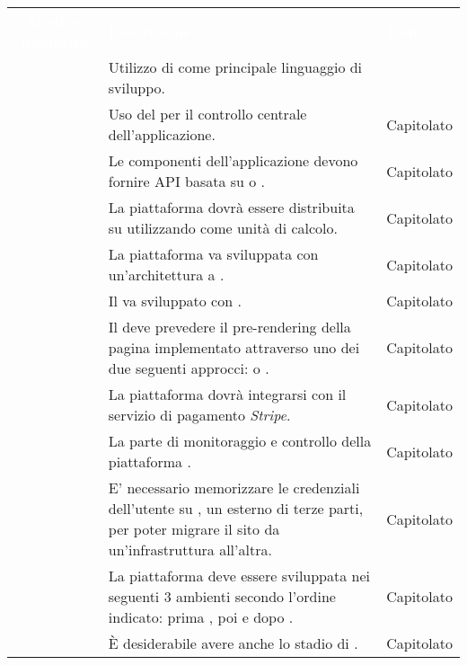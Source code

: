 \renewcommand{\arraystretch}{1.5}
\begin{longtable}{|c C{9.5cm} C{2.5cm}|} 
	
	\textcolor{white}{\textbf{Codice Requisito}}&
	\textcolor{white}{\textbf{Descrizione}}&
	\textcolor{white}{\textbf{Fonte}}\\
	
	 & Utilizzo di  come principale linguaggio di sviluppo. &  \\
	
	 & Uso del   per il controllo centrale dell'applicazione. & Capitolato \\
	
	 & Le componenti dell'applicazione devono fornire API basata su  o . & Capitolato \\
	
	 & La piattaforma dovrà essere distribuita su  utilizzando  come unità di calcolo. & Capitolato \\
	
	 & La piattaforma va sviluppata con un'architettura a . & Capitolato \\
	
	 & Il  va sviluppato con . & Capitolato \\
	
	 & Il  deve prevedere il pre-rendering della pagina  implementato attraverso uno dei due seguenti approcci:  o . & Capitolato \\
	
	 & La piattaforma dovrà integrarsi con il servizio di pagamento \textit{Stripe}. & Capitolato \\
	
	 & La parte di monitoraggio e controllo della piattaforma . & Capitolato \\
	
	 & E' necessario memorizzare le credenziali dell'utente su , un  esterno di terze parti, per poter migrare il sito da un'infrastruttura all'altra. & Capitolato \\
	
	 & La piattaforma deve essere sviluppata nei seguenti 3 ambienti secondo l'ordine indicato: prima , poi  e dopo . & Capitolato \\
	
	 & È desiderabile avere anche lo stadio di . & Capitolato \\
	
\end{longtable}
